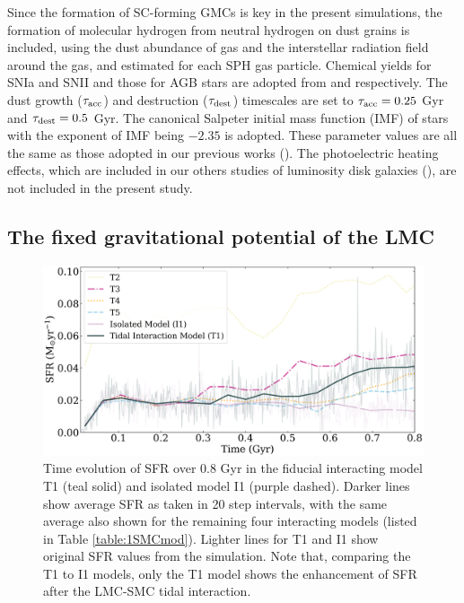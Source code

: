 \documentclass[fleqn,usenatbib]{mnras}
\begin{document}
Since the formation of SC-forming GMCs is key in the present simulations, the formation of molecular hydrogen from neutral hydrogen on dust grains is included, using the dust abundance of gas and the interstellar
radiation field around the gas, and estimated for each SPH gas particle. Chemical yields for SNIa and SNII and those for AGB stars are adopted from \cite[T95]{K8_Tsujimoto_et_al1995}  and
\cite[VG97]{K9_Van_den_hoek_Groenewegen1997} respectively.
The dust growth ($\tau_{\rm acc}$) and destruction ($\tau_{\rm dest}$) timescales are set to $\tau_{\rm acc}=0.25$ Gyr and $\tau_{\rm dest}=0.5$ Gyr.
The canonical Salpeter initial mass function (IMF) of stars with the exponent of IMF being $-2.35$ is adopted. These parameter values are all the same as those
adopted in our previous works (\citealt{K5_Bekki2013}). The photoelectric heating effects, which are included in our others studies of luminosity disk galaxies (\citealt{K10_Osman_Bekki_Cortese2020}), are not included in the present study.


\subsection{The fixed gravitational potential of the LMC}

\begin{figure}
 \includegraphics[width=\columnwidth]{2_figure_attempt_with_averages_oppossite_emphisisFINAL.png}
 \caption{Time evolution of SFR over 0.8 Gyr in the fiducial interacting model T1 (teal solid) and isolated model I1 (purple dashed). 
 Darker lines show average SFR as taken in 20 step intervals, with the same average also shown for the remaining four interacting models (listed in Table \ref{table:1SMCmod}). Lighter lines for T1 and I1 show original SFR values from the simulation.
 Note that, comparing the T1 to I1 models, only the T1 model shows the enhancement of SFR after the LMC-SMC tidal interaction.}
 \label{fig:2SFR}
\end{figure}
\end{document}
